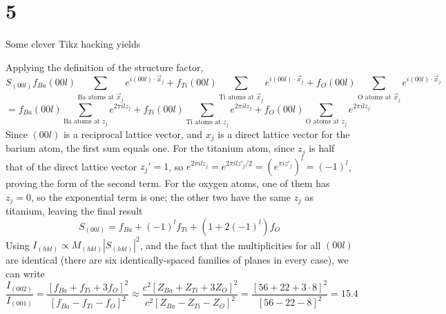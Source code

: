 \documentclass{article}
\newcommand{\Ba}[2]{\draw (#1,#2) circle (.25cm);\shade[ball color=red] (#1,#2) circle (.25cm);}
\newcommand{\Ti}[2]{\draw (#1,#2) circle (.25cm);\shade[ball color=green] (#1,#2) circle (.25cm);}
\newcommand{\Ox}[2]{\draw (#1,#2) circle (.25cm);\shade[ball color=blue] (#1,#2) circle (.25cm);}
\begin{document}
\section*{5}
Some clever Tikz hacking yields
\begin{center}
\end{center}
Applying the definition of the structure factor,
\[
  S_{(00l)}f_{Ba}(00l)\sum_{\textrm{Ba atoms at }\vec{x}_{j}}e^{i(00l)\cdot \vec{x}_{j}}
  +f_{Ti}(00l)\sum_{\textrm{Ti atoms at }\vec{x}_{j}}e^{i(00l)\cdot \vec{x}_{j}}
  +f_{O}(00l)\sum_{\textrm{O atoms at }\vec{x}_{j}}e^{i(00l)\cdot \vec{x}_{j}}
\]
\[
  =  f_{Ba}(00l)\sum_{\textrm{Ba atoms at }z_{j}}e^{2\pi ilz_{j}}
  +f_{Ti}(00l)\sum_{\textrm{Ti atoms at }z_{j}}e^{2\pi ilz_{j}}
  +f_{O}(00l)\sum_{\textrm{O atoms at }z_{j}}e^{2\pi ilz_{j}}
\]
Since $(00l)$ is a reciprocal lattice vector, and $x_{j}$ is a direct lattice vector for the barium atom, the first sum equals one.
For the titanium atom, since $z_{j}$ is half that of the direct lattice vector $z_{j}'=1$, so
$e^{2\pi ilz_{j}}=e^{2\pi ilz'_{j}/2}=(e^{\pi iz'_{j}})^{l}=(-1)^{l}$, proving the form of the second term.
For the oxygen atoms, one of them has $z_{j}=0$, so the exponential term is one; the other two have the same $z_{j}$ as titanium, leaving
the final result
\[
  S_{(00l)}=f_{Ba}+(-1)^{l}f_{Ti}+(1+2(-1)^{l})f_{O}
\]
Using $I_{(hkl)}\propto M_{(hkl)}|S_{(hkl)}|^{2}$, and the fact that the multiplicities for all $(00l)$ are identical
(there are six identically-spaced families of planes in every case), we can write
\[
  \frac{I_{(002)}}{I_{(001)}}=\frac{[f_{Ba}+f_{Ti}+3f_{O}]^{2}}{[f_{Ba}-f_{Ti}-f_{O}]^{2}}
  \approx \frac{c^{2}[Z_{Ba}+Z_{Ti}+3Z_{O}]^{2}}{c^{2}[Z_{Ba}-Z_{Ti}-Z_{O}]^{2}}
  =\frac{[56+22+3\cdot8]^{2}}{[56-22-8]^{2}}
  =15.4
\]
\end{document}
